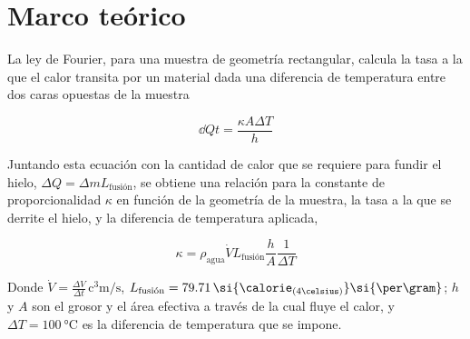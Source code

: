 \section{Marco teórico}

La ley de Fourier, para una muestra de geometría rectangular, calcula la tasa a la que el calor transita por un material dada una diferencia de temperatura entre dos caras opuestas de la muestra

\begin{equation}
    \dd{Q}{t} = \frac{\kappa A \Delta T}{h}
\end{equation}

Juntando esta ecuación con la cantidad de calor que se requiere para fundir el hielo,  $\Delta Q = \Delta m L_{\text{fusión}}$, se obtiene una relación para la constante de proporcionalidad $\kappa$ en función de la geometría de la muestra, la tasa a la que se derrite el hielo, y la diferencia de temperatura aplicada,

\begin{equation}
\kappa = \rho_{\text{agua}}\dot V L_{\text {fusión}}\frac{h}{A}\frac{1}{\Delta T}
\label{eq:kappa_exp}
\end{equation}

Donde $\dot V = \frac{\Delta V}{\Delta t} \,\si{\cubic\centi\meter\per\second}$, $L_{\text {fusión}} = 79.71\,\si{\calorie_{(4\celsius)}}\si{\per\gram}$; $h$ y $A$ son el grosor y el área efectiva a través de la cual fluye el calor, y $\Delta T = \SI{100}{\celsius}$ es la diferencia de temperatura que se impone.

